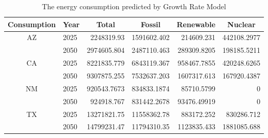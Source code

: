 \begin{table}[htbp]
	\centering
	\caption{The energy consumption predicted by Growth Rate Model}
	\label{my-label}
	\begin{tabular}{|c|l|r|r|r|r|}
		\hline
		Consumption         & \multicolumn{1}{c|}{Year} & \multicolumn{1}{c|}{Total} & \multicolumn{1}{c|}{Fossil} & \multicolumn{1}{c|}{Renewable} & \multicolumn{1}{c|}{Nuclear} \\ \hline
		\multirow{2}{*}{AZ} & 2025                      & 2248319.93                 & 1591602.402                 & 214609.231                     & 442108.2977                  \\ \cline{2-6} 
		& 2050                      & 2974605.804                & 2487110.463                 & 289309.8205                    & 198185.5211                  \\ \hline
		\multirow{2}{*}{CA} & 2025                      & 8221835.779                & 6843119.367                 & 958467.7855                    & 420248.6265                  \\ \cline{2-6} 
		& 2050                      & 9307875.255                & 7532637.203                 & 1607317.613                    & 167920.4387                  \\ \hline
		\multirow{2}{*}{NM} & 2025                      & 920543.7673                & 834833.1874                 & 85710.5799                     & 0                            \\ \cline{2-6} 
		& 2050                      & 924918.767                 & 831442.2678                 & 93476.49919                    & 0                            \\ \hline
		\multirow{2}{*}{TX} & 2025                      & 13271821.75                & 11558362.78                 & 883172.252                     & 830286.712                   \\ \cline{2-6} 
		& 2050                      & 14799231.47                & 11794310.35                 & 1123835.433                    & 1881085.688                  \\ \hline
	\end{tabular}
\label{tab:GroPredict}%
\end{table}


